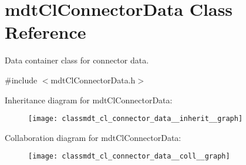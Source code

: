 \hypertarget{classmdt_cl_connector_data}{\section{mdt\-Cl\-Connector\-Data Class Reference}
\label{classmdt_cl_connector_data}
}


Data container class for connector data.  




{\ttfamily \#include $<$mdt\-Cl\-Connector\-Data.\-h$>$}



Inheritance diagram for mdt\-Cl\-Connector\-Data\-:\nopagebreak
\begin{figure}[H]
\begin{center}
\leavevmode
\texttt{[image: classmdt\_cl\_connector\_data\_\_inherit\_\_graph]}
\end{center}
\end{figure}


Collaboration diagram for mdt\-Cl\-Connector\-Data\-:\nopagebreak
\begin{figure}[H]
\begin{center}
\leavevmode
\texttt{[image: classmdt\_cl\_connector\_data\_\_coll\_\_graph]}
\end{center}
\end{figure}
